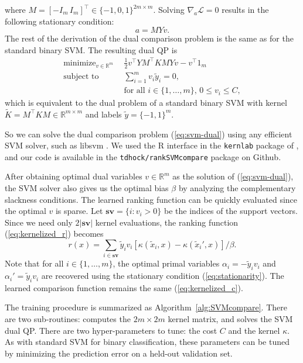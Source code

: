 \documentclass{article}
\newcommand{\RR}{\mathbb R}
\DeclareMathOperator*{\minimize}{minimize}
\begin{document}
where $M=[-I_m \, I_m]^\intercal\in\{-1,0,1\}^{2m\times m}$. Solving
$\nabla_a \mathcal L=0$ results in the following stationary condition:
\begin{equation}
  \label{eq:stationarity}
  a = M Y v.
\end{equation}
The rest of the derivation of the dual comparison problem is the same
as for the standard binary SVM. The resulting dual QP is
\begin{equation}
  \begin{aligned}
    \label{eq:svm-dual}
    \minimize_{v\in\RR^m}\ \ &
    \frac 1 2 v^\intercal Y M^\intercal K M Y v - v^\intercal 1_m\\
    \text{subject to}\ \ &
    \sum_{i=1}^m v_i \tilde y_i = 0,\\
&    \text{for all $i\in\{1,\dots,m\}$, } 0\leq v_i\leq C,
  \end{aligned}
\end{equation}
which is equivalent to the dual problem of a standard binary SVM with
kernel $\tilde K = M^\intercal K M\in\RR^{m\times m}$ and labels
$\tilde y=\{-1,1\}^m$.

So we can solve the dual comparison problem (\ref{eq:svm-dual}) using
any efficient SVM solver, such as libsvm \citep{libsvm}. We used the R
interface in the \texttt{kernlab} package of \citet{kernlab}, and our
code is available in the \texttt{tdhock/rankSVMcompare} package on Github.

After obtaining optimal dual variables $v\in\RR^m$ as the solution of
(\ref{eq:svm-dual}), the SVM solver also gives us the optimal bias
$\beta$ by analyzing the complementary slackness conditions.
The learned ranking function can be quickly evaluated since the
optimal $v$ is sparse. Let $\textbf{sv}=\{i: v_i > 0\}$ be the indices
of the support vectors. Since we need only $2|\textbf{sv}|$ kernel
evaluations, the ranking function (\ref{eq:kernelized_r}) becomes
\begin{equation}
  \label{eq:r_sv}
  r(x)= 
  \sum_{i\in \textbf{sv}}
  \tilde y_i v_i\left[ 
    \kappa(\tilde x_i, x)
    - \kappa(\tilde x_i', x)
  \right]/\beta.
\end{equation}
Note that for all $i\in\{1,\dots,m\}$, the optimal primal variables
$\alpha_i=-\tilde y_i v_i$ and $\alpha_i'=\tilde y_i v_i$ are
recovered using the stationary condition (\ref{eq:stationarity}). The
learned comparison function remains the same (\ref{eq:kernelized_c}).

The training procedure is summarized as
Algorithm~\ref{alg:SVMcompare}. There are two sub-routines:
 computes the $2m\times 2m$ kernel matrix, and
 solves the SVM dual QP. There are two hyper-parameters
to tune: the cost $C$ and the kernel $\kappa$. As with standard SVM
for binary classification, these parameters can be tuned by minimizing
the prediction error on a held-out validation set.
\end{document}
